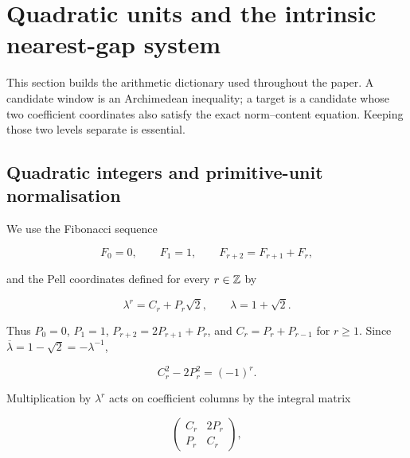 %
%
\section{Quadratic units and the intrinsic nearest-gap system}
\label{sec:system}

This section builds the arithmetic dictionary used throughout the paper. A
candidate window is an Archimedean inequality; a target is a candidate whose
two coefficient coordinates also satisfy the exact norm--content equation.
Keeping those two levels separate is essential.

\subsection{Quadratic integers and primitive-unit normalisation}

We use the Fibonacci sequence

\begin{equation}
 F_0=0,
 \qquad
 F_1=1,
 \qquad
 F_{r+2}=F_{r+1}+F_r,
 \label{eq:fibonacci}
\end{equation}

and the Pell coordinates defined for every $r\in\mathbb{Z}$ by

\begin{equation}
 \lambda^r=C_r+P_r\sqrt2,
 \qquad
 \lambda=1+\sqrt2.
 \label{eq:pell-coordinates}
\end{equation}

Thus $P_0=0$, $P_1=1$, $P_{r+2}=2P_{r+1}+P_r$, and
$C_r=P_r+P_{r-1}$ for $r\geqslant1$. Since
$\overline\lambda=1-\sqrt2=-\lambda^{-1}$,

\begin{equation}
 C_r^2-2P_r^2=(-1)^r.
 \label{eq:pell-norm}
\end{equation}

Multiplication by $\lambda^r$ acts on coefficient columns by the integral
matrix

\begin{equation}
 \begin{pmatrix}C_r&2P_r\\ P_r&C_r\end{pmatrix},
 \label{eq:unit-matrix}
\end{equation}

